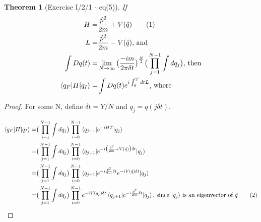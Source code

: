 \documentclass[]{article}
\newcommand\numberthis{\addtocounter{equation}{1}\tag{\theequation}}
\newtheorem{thm}{Theorem}
\begin{document}
\begin{thm}[Exercise I/2/1 - eq(5)]
	If
	\begin{align*}
		H =& \frac{\hat{p}^2}{2m} + V(\hat{q})\numberthis \label{eq:H} \\
		L =& \frac{\hat{p}^2}{2m} - V(\hat{q}) \text{, and}\\
		\int Dq(t)=& \lim_{N\rightarrow\infty} \big(\frac{-i m}{2\pi \delta t}\big)^\frac{N}{2} \big(\prod_{j=1}^{N-1} \int dq_j\big) \text{, then}\\
		\braket{q_F\vert H\vert q_I} =& \int Dq(t) e^{i \int_{0}^{T}dt L} \text{, where}\\	
	\end{align*}
\end{thm}
\begin{proof}
	For some N, define $\delta t =Y/N$ and $q_j= q(j \delta t)$.
	
	\begin{align*}
		\braket{q_F\vert H\vert q_I} =& \big(\prod_{j=1}^{N-1} \int dq_j\big)\prod_{i=0}^{N-1} \braket{q_{j+1} \vert e^{-iHT} \vert q_j}\\
		=& \big(\prod_{j=1}^{N-1} \int dq_j\big)\prod_{i=0}^{N-1} \braket{q_{j+1} \vert e^{-i\big(\frac{\hat{p}^2}{2m} + V(\hat{q})\big)\delta t} \vert q_j}\\
		=& \big(\prod_{j=1}^{N-1} \int dq_j\big)\prod_{i=0}^{N-1} \braket{q_{j+1} \vert e^{-i\frac{\hat{p}^2}{2m} \delta t} e^{-i V(\hat{q}) \delta t} \vert q_j}\\
		=& \big(\prod_{j=1}^{N-1} \int dq_j\big)\prod_{i=0}^{N-1} e^{-i V(q_j) \delta t} \braket{q_{j+1} \vert e^{-i\frac{\hat{p}^2}{2m} \delta t}  \vert q_j} \text{, since $\ket{q_j}$ is an eigenvector of $\hat{q}$} \numberthis \label{eq:qHq}
	\end{align*}
	

\end{proof}
\end{document}
